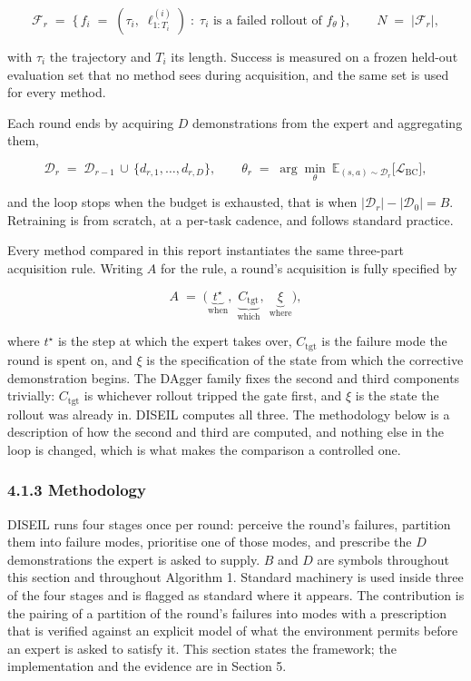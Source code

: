 \documentclass[
  11pt,
]{article}
\begin{document}
\[\mathcal{F}_r \;=\; \big\{\, f_i \;=\; (\tau_i,\; \ell^{(i)}_{1:T_i}) \;:\; \tau_i \text{ is a failed rollout of } f_\theta \,\big\}, \qquad N \;=\; |\mathcal{F}_r|, \tag{2}\]

with \(\tau_i\) the trajectory and \(T_i\) its length. Success is
measured on a frozen held-out evaluation set that no method sees during
acquisition, and the same set is used for every method.

Each round ends by acquiring \(D\) demonstrations from the expert and
aggregating them,

\[\mathcal{D}_r \;=\; \mathcal{D}_{r-1} \,\cup\, \{d_{r,1},\dots,d_{r,D}\}, \qquad \theta_r \;=\; \arg\min_\theta\ \mathbb{E}_{(s,a)\sim\mathcal{D}_r}\big[\mathcal{L}_{\mathrm{BC}}\big], \tag{3}\]

and the loop stops when the budget is exhausted, that is when
\(|\mathcal{D}_r| - |\mathcal{D}_0| = B\). Retraining is from scratch,
at a per-task cadence, and follows standard practice.

Every method compared in this report instantiates the same three-part
acquisition rule. Writing \(A\) for the rule, a round's acquisition is
fully specified by

\[A \;=\; \big(\underbrace{t^\star}_{\text{when}},\; \underbrace{C_{\mathrm{tgt}}}_{\text{which}},\; \underbrace{\xi}_{\text{where}}\big), \tag{4}\]

where \(t^\star\) is the step at which the expert takes over,
\(C_{\mathrm{tgt}}\) is the failure mode the round is spent on, and
\(\xi\) is the specification of the state from which the corrective
demonstration begins. The DAgger family fixes the second and third
components trivially: \(C_{\mathrm{tgt}}\) is whichever rollout tripped
the gate first, and \(\xi\) is the state the rollout was already in.
DISEIL computes all three. The methodology below is a description of how
the second and third are computed, and nothing else in the loop is
changed, which is what makes the comparison a controlled one.

\hypertarget{methodology}{%
\subsubsection{4.1.3 Methodology}\label{methodology}}

DISEIL runs four stages once per round: perceive the round's failures,
partition them into failure modes, prioritise one of those modes, and
prescribe the \(D\) demonstrations the expert is asked to supply. \(B\)
and \(D\) are symbols throughout this section and throughout Algorithm
1. Standard machinery is used inside three of the four stages and is
flagged as standard where it appears. The contribution is the pairing of
a partition of the round's failures into modes with a prescription that
is verified against an explicit model of what the environment permits
before an expert is asked to satisfy it. This section states the
framework; the implementation and the evidence are in Section 5.
\end{document}
